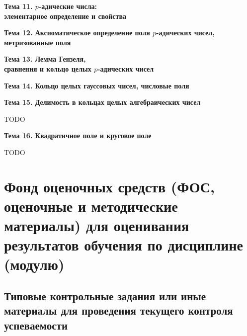 \documentclass[a4paper, 12pt]{article}
\begin{document}
\begin{center} {\bf Тема 11. $p$-адические числа:\\ элементарное определение и свойства} \end{center}



\begin{center} {\bf Тема 12. Аксиоматическое определение поля $p$-адических чисел,\\ метризованные поля} \end{center}



\begin{center} {\bf Тема 13. Лемма Гензеля,\\ сравнения и кольцо целых $p$-адических чисел} \end{center}



\begin{center} {\bf Тема 14. Кольцо целых гауссовых чисел, числовые поля} \end{center}



\begin{center} {\bf Тема 15. Делимость в кольцах целых алгебраических чисел} \end{center} TODO
\begin{center} {\bf Тема 16. Квадратичное поле и круговое поле} \end{center} TODO


\section{Фонд оценочных средств (ФОС, оценочные и методические материалы) для оценивания результатов обучения по дисциплине (модулю)}

\subsection{Типовые контрольные задания или иные материалы для проведения текущего контроля успеваемости}
\end{document}
